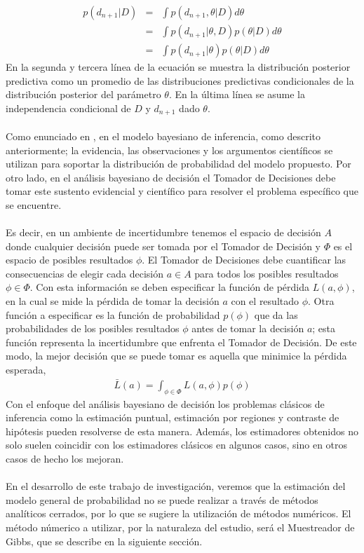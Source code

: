 \begin{eqnarray*}
p(d_{n+1}|D)&=&\int p(d_{n+1},\theta|D) d\theta \\
			&=& \int p(d_{n+1}|\theta,D)p(\theta|D)d\theta \\
			&=& \int p(d_{n+1}|\theta)p(\theta|D)d\theta
\end{eqnarray*}
En la segunda y tercera l\'inea de la ecuaci\'on se muestra la distribuci\'on posterior predictiva como un promedio de las distribuciones predictivas condicionales de la distribuci\'on posterior del par\'ametro $\theta$. En la \'ultima l\'inea se asume la independencia condicional de $D$ y $d_{n+1}$ dado $\theta$.\\
\\
Como enunciado en \cite{smith2010bayesian}, en el modelo bayesiano de inferencia, como descrito anteriormente; la evidencia, las observaciones y los argumentos cient\'ificos se utilizan para soportar la distribuci\'on de probabilidad del modelo propuesto. Por otro lado, en el an\'alisis bayesiano de decisi\'on el Tomador de Decisiones debe tomar este sustento evidencial y cient\'ifico para resolver el problema espec\'ifico que se encuentre.\\
\\
Es decir, en un ambiente de incertidumbre tenemos el espacio de decisi\'on $A$ donde cualquier decisi\'on puede ser tomada por el Tomador de Decisi\'on y $\Phi$ es el espacio de posibles resultados $\phi$. El Tomador de Decisiones debe cuantificar las consecuencias de elegir cada decisi\'on $a \in A$ para todos los posibles resultados $\phi \in \Phi$. Con esta informaci\'on se deben especificar la funci\'on de p\'erdida $L(a,\phi)$, en la cual se mide la p\'erdida de tomar la decisi\'on $a$ con el resultado $\phi$. Otra funci\'on a especificar es la funci\'on de probabilidad $p(\phi)$ que da las probabilidades de los posibles resultados $\phi$ antes de tomar la decisi\'on $a$; esta funci\'on representa la incertidumbre que enfrenta el Tomador de Decisi\'on. De este modo, la mejor decisi\'on que se puede tomar es aquella que minimice la p\'erdida esperada,
\begin{align*}
\bar{L}(a)= \int_{\phi \in \Phi} L(a,\phi)p(\phi)
\end{align*}
Con el enfoque del an\'alisis bayesiano de decisi\'on los problemas cl\'asicos de inferencia como la estimaci\'on puntual, estimaci\'on por regiones y contraste de hip\'otesis pueden resolverse de esta manera. Adem\'as, los estimadores obtenidos no solo suelen coincidir con los estimadores cl\'asicos en algunos casos, sino en otros casos de hecho los mejoran.\\
\\
En el desarrollo de este trabajo de investigaci\'on, veremos que la estimaci\'on del modelo general de probabilidad no se puede realizar a trav\'es de m\'etodos anal\'iticos cerrados, por lo que se sugiere la utilizaci\'on de m\'etodos num\'ericos. El m\'etodo n\'umerico a utilizar, por la naturaleza del estudio, ser\'a el Muestreador de Gibbs, que se describe en la siguiente secci\'on.

